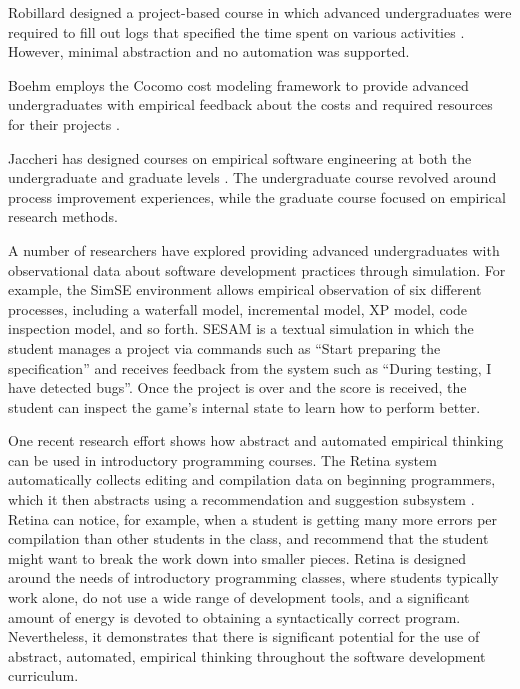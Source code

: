 Robillard designed a project-based course in which advanced undergraduates were required
to fill out logs that specified the time spent on various activities
\citep{Robillard98}.  However, minimal abstraction and no automation was supported.

Boehm employs the Cocomo cost modeling framework to provide advanced undergraduates with
empirical feedback about the costs and required resources for their
projects \citep{Valerdi07}.

Jaccheri has designed courses on empirical software engineering at both the 
undergraduate and graduate levels \citep{Dingsoyr99,Jaccheri05}.  The undergraduate course 
revolved around process improvement experiences, while the graduate course focused on 
empirical research methods.  

A number of researchers have explored providing advanced undergraduates
with observational data about software development practices through
simulation.  For example, the SimSE environment \citep{Navarro07,Navarro09}
allows empirical observation of six different processes, including a
waterfall model, incremental model, XP model, code inspection model, and so
forth.  SESAM \citep{Drappa00} is a textual simulation in which the student
manages a project via commands such as ``Start preparing the
specification'' and receives feedback from the system such as ``During
testing, I have detected bugs''. Once the project is over and the score is
received, the student can inspect the game's internal state to learn how to
perform better.

One recent research effort shows how abstract and automated empirical
thinking can be used in introductory programming courses. The Retina system
automatically collects editing and compilation data on beginning
programmers, which it then abstracts using a recommendation and suggestion
subsystem \citep{Murphy09}.  Retina can notice, for example, when a student
is getting many more errors per compilation than other students in the
class, and recommend that the student might want to break the work down
into smaller pieces.  Retina is designed around the needs of introductory
programming classes, where students typically work alone, do not use a wide
range of development tools, and a significant amount of energy is devoted
to obtaining a syntactically correct program.  Nevertheless, it
demonstrates that there is significant potential for the use of abstract,
automated, empirical thinking throughout the software development
curriculum.  

